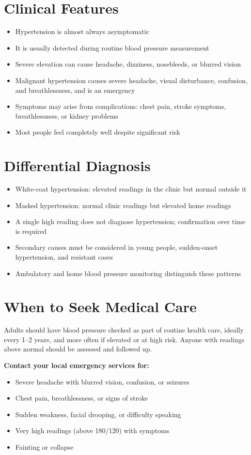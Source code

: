 \section*{Clinical Features}
\begin{itemize}
    \item Hypertension is almost always asymptomatic
    \item It is usually detected during routine blood pressure measurement
    \item Severe elevation can cause headache, dizziness, nosebleeds, or blurred vision
    \item Malignant hypertension causes severe headache, visual disturbance, confusion, and breathlessness, and is an emergency
    \item Symptoms may arise from complications: chest pain, stroke symptoms, breathlessness, or kidney problems
    \item Most people feel completely well despite significant risk
\end{itemize}

\section*{Differential Diagnosis}
\begin{itemize}
    \item White-coat hypertension: elevated readings in the clinic but normal outside it
    \item Masked hypertension: normal clinic readings but elevated home readings
    \item A single high reading does not diagnose hypertension; confirmation over time is required
    \item Secondary causes must be considered in young people, sudden-onset hypertension, and resistant cases
    \item Ambulatory and home blood pressure monitoring distinguish these patterns
\end{itemize}

\section*{When to Seek Medical Care}
Adults should have blood pressure checked as part of routine health care, ideally every 1--2 years, and more often if elevated or at high risk. Anyone with readings above normal should be assessed and followed up.

\textbf{Contact your local emergency services for:}
\begin{itemize}
    \item Severe headache with blurred vision, confusion, or seizures
    \item Chest pain, breathlessness, or signs of stroke
    \item Sudden weakness, facial drooping, or difficulty speaking
    \item Very high readings (above 180/120) with symptoms
    \item Fainting or collapse
\end{itemize}

